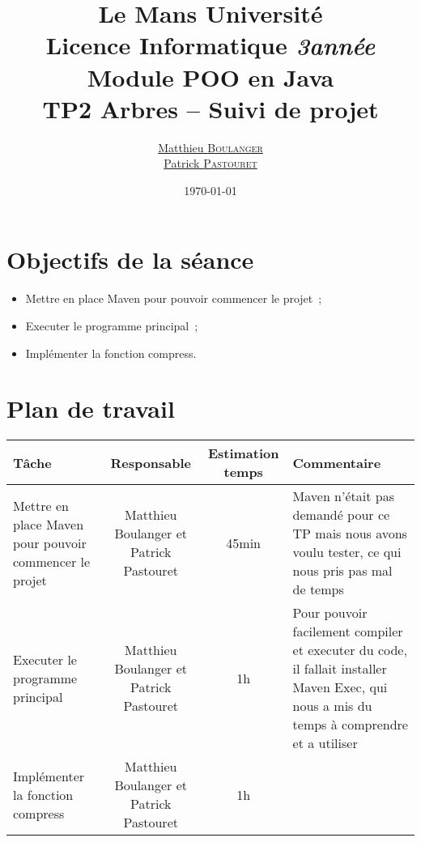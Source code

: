 \documentclass[a4paper,11pt]{article}
\title {\textbf {\color {blue} Le Mans Université}\color{black}
\\  Licence Informatique  \textit {3\ieme année}
 \\Module POO en Java
 \\ \textbf {TP2 Arbres – Suivi de projet}}
\author{\href{mailto: matthieu.boulanger.etu@univ-lemans.fr} {Matthieu \textsc{Boulanger}}\\
      \href{mailto: patrick.pastouret.etu@univ-lemans.fr} {Patrick \textsc{Pastouret}}}
\date{\today}
\begin{document}
\maketitle

\section{Objectifs de la séance}
\begin{itemize}
    \item Mettre en place Maven pour pouvoir commencer le projet~;
    \item Executer le programme principal~;
    \item Implémenter la fonction compress.
\end{itemize}

\section{Plan de travail}
\begin{center}
    \begin{tabular}{p{.3\linewidth}ccp{.3\linewidth}}
      \toprule
	Tâche & Responsable & Estimation temps & Commentaire \\
      \midrule
      Mettre en place Maven pour pouvoir commencer le projet & 
      Matthieu Boulanger et Patrick Pastouret & 
      45min & 
      Maven n'était pas demandé pour ce TP mais nous avons voulu tester, ce qui nous pris pas mal de temps \\
      Executer le programme principal &
      Matthieu Boulanger et Patrick Pastouret &
      1h &
      Pour pouvoir facilement compiler et executer du code, il fallait installer Maven Exec, qui nous a mis du temps à comprendre et a utiliser\\
      Implémenter la fonction compress &
      Matthieu Boulanger et Patrick Pastouret &
      1h &
      \\
      \bottomrule
   \end{tabular}
\end{center}
\end{document}
